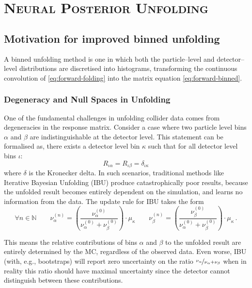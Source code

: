 \chapter{\textsc{Neural Posterior Unfolding}}
\label{chap:npu}
\section{Motivation for improved binned unfolding}
    A binned unfolding method is one in which both the particle--level and detector--level distributions are discretised into histograms, transforming the continuous convolution of \cref{eq:forward-folding} into the matrix equation \cref{eq:forward-binned}.

\subsection{Degeneracy and Null Spaces in Unfolding}
    One of the fundamental challenges in unfolding collider data comes from degeneracies in the response matrix.
    Consider a case where two particle level bins $\alpha$ and $\beta$ are indistinguishable at the detector level.
    This statement can be formalised as, there exists a detector level bin $\kappa$ such that for all detector level bins $\iota$:
    \begin{equation}
        R_{\iota\alpha} = R_{\iota\beta} = \delta_{\iota\kappa}
    \end{equation}
    where $\delta$ is the Kronecker delta.
    In such scenarios, traditional methods like Iterative Bayesian Unfolding (IBU) produce catastrophically poor results, because the unfolded result becomes entirely dependent on the simulation, and learns no information from the data.
    The update rule for IBU takes the form
    \begin{equation}
        \forall n \in \mathbb{N}
        \qquad
        \nu_{\alpha}^{(n)} = \left(\frac{\nu_\alpha^{(0)}}{\nu_\alpha^{(0)} + \nu_{\beta}^{(0)}}\right) \cdot \mu_\kappa
        \qquad
        \nu_{\beta}^{(n)} = \left(\frac{\nu_\beta^{(0)}}{\nu_\alpha^{(0)} + \nu_{\beta}^{(0)}}\right) \cdot \mu_\kappa\,.
    \end{equation}

    This means the relative contributions of bins $\alpha$ and $\beta$ to the unfolded result are entirely determined by the MC, regardless of the observed data.
    Even worse, IBU (with, e.g., bootstraps) will report zero uncertainty on the ratio \(\nicefrac{\nu_\alpha}{\nu_\alpha+\nu_\beta}\) when in reality this ratio should have maximal uncertainty since the detector cannot distinguish between these contributions.

